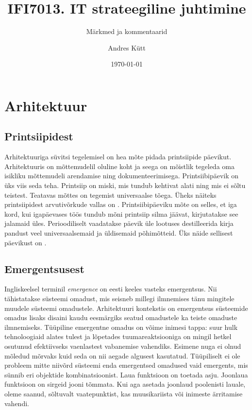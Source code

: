 \documentclass{article}
\title{IFI7013. IT strateegiline juhtimine}
\subtitle{Märkmed ja kommentaarid}
\date{\today}
\author{Andres Kütt}
\begin{document}
\maketitle
\clearpage
\tableofcontents
\clearpage

\section{Arhitektuur}
\subsection{Printsiipidest}
Arhitektuuriga süvitsi tegelemisel on hea mõte pidada printsiipide päevikut. Arhitektuuris on mõttemudelil oluline koht ja seega on mõistlik tegeleda oma isikliku mõttemudeli arendamise ning dokumenteerimisega. Printsiibipäevik on üks viis seda teha. Printsiip on miski, mis tundub kehtivat alati ning mis ei sõltu teistest. Teatavas mõttes on tegemist universaalse tõega. Üheks näiteks printsiipidest arvutivõrkude vallas on \cite{callon1996rfc}. Printsiibipäeviku mõte on selles, et iga kord, kui igapäevases töös tundub mõni printsiip silma jäävat, kirjutatakse see jalamaid üles. Perioodiliselt vaadatakse päevik üle lootuses destilleerida kirja pandust veel universaalsemaid ja üldisemaid põhimõtteid. Üks näide sellisest päevikust on \cite{archprinciples}. 

\subsection{Emergentsusest}
Ingliskeelsel terminil \emph{emergence} on eesti keeles vasteks emergentsus. Nii tähistatakse süsteemi omadust, mis seisneb millegi ilmnemises tänu mingitele muudele süsteemi omadustele. Arhitektuuri kontekstis on emergentsus süsteemide omadus lisaks disaini kaudu eesmärgiks seatud omadustele ka teiste omaduste ilmnemiseks. Tüüpiline emergentne omadus on võime inimesi tappa: suur hulk tehnoloogiaid alates tulest ja lõpetades tuumareaktsiooniga on mingil hetkel osutunud efektiivseks vaenlastest vabanemise vahendiks. Esimene nuga ei olnud mõledud mõrvaks kuid seda on nii aegade algusest kasutatud. Tüüpiliselt ei ole probleem mitte niivõrd süsteemi enda emergentsed omadused vaid emergents, mis sünnib eri objektide kombinatsioonist. Laua funktsioon on toetada asju. Joonlaua funktsioon on sirgeid jooni tõmmata. Kui aga asetada joonlaud poolenisti lauale, oleme saanud, sõltuvalt vaatepunktist, kas muusikariista või inimeste ärritamise vahendi. 
\end{document}

